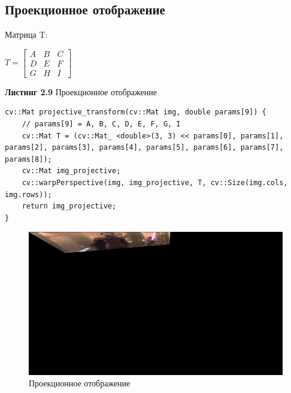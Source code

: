 \subsection{Проекционное отображение}
\noindent Матрица T:
\begin{center}
    $
    T = 
    \begin{bmatrix}
        A & B & C\\
        D & E & F\\
        G & H & I
    \end{bmatrix}
    $
\end{center}
\noindent \textbf{Листинг 2.9} Проекционное отображение
\begin{lstlisting}
cv::Mat projective_transform(cv::Mat img, double params[9]) {
    // params[9] = A, B, C, D, E, F, G, I
    cv::Mat T = (cv::Mat_ <double>(3, 3) << params[0], params[1], params[2], params[3], params[4], params[5], params[6], params[7], params[8]);
    cv::Mat img_projective;
    cv::warpPerspective(img, img_projective, T, cv::Size(img.cols, img.rows));
    return img_projective;
}
\end{lstlisting}
\begin{figure}[h]
    \centering
    \includegraphics[scale=0.3]{"../images/results/projective_transformed_image.jpg"}
    \caption{Проекционное отображение}
\end{figure}

